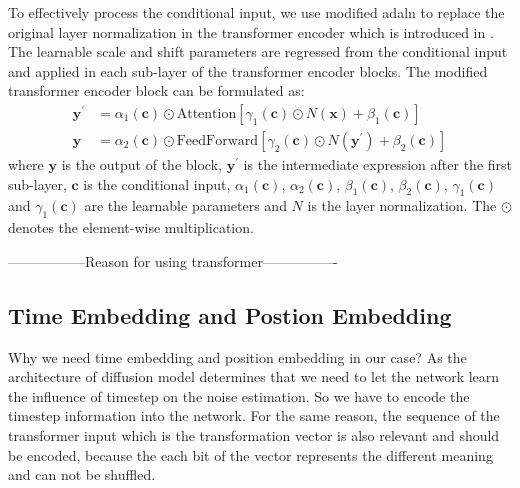 \documentclass[12pt,DIV14,BCOR12mm,a4paper,footinclude=false,headinclude,parskip=half-,twoside,openright,cleardoublepage=empty,toc=index,bibliography=totoc,listof=totoc]{scrreprt}
\numberwithin{equation}{chapter}
\begin{document}
To effectively process the conditional input, we use modified \gls{adaln} to replace the original layer normalization in the transformer encoder which is introduced in \cite{perez2017film,Peebles2022DiT}. The learnable scale and shift parameters are regressed from the conditional input and applied in each sub-layer of the transformer encoder blocks. The modified transformer encoder block can be formulated as:
\begin{align}
  \mathbf{y}^{'} &= \alpha_{1}(\mathbf{c})\odot {\text{Attention}[\gamma_{1}(\mathbf{c})\odot N(\mathbf{x}) + \beta_{1}(\mathbf{c})]}\\
  \mathbf{y} &= \alpha_{2}(\mathbf{c})\odot {\text{FeedForward}[\gamma_{2}(\mathbf{c})\odot N(\mathbf{y}^{'}) + \beta_{2}(\mathbf{c})]}
\end{align}
where $\mathbf{y}$ is the output of the block, $\mathbf{y}^{'}$ is the intermediate expression after the first sub-layer,  $\mathbf{c}$ is the conditional input, $\alpha_{1}(\mathbf{c})$, $\alpha_{2}(\mathbf{c})$, $\beta_{1}(\mathbf{c})$, $\beta_{2}(\mathbf{c})$, $\gamma_{1}(\mathbf{c})$ and $\gamma_{1}(\mathbf{c})$ are the learnable parameters and $N$ is the layer normalization. The $\odot$ denotes the element-wise multiplication.

-----------------Reason for using transformer----------------

\subsection{Time Embedding and Postion Embedding}
Why we need time embedding and position embedding in our case? As the architecture of diffusion model determines that we need to let the network learn the influence of timestep on the noise estimation. So we have to encode the timestep information into the network. For the same reason, the sequence of the transformer input which is the transformation vector is also relevant and should be encoded, because the each bit of the vector represents the different meaning and can not be shuffled.
\end{document}
